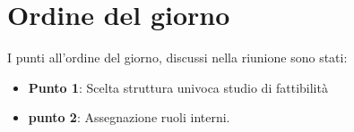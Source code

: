 \section{Ordine del giorno}
I punti all'ordine del giorno, discussi nella riunione sono stati:
\begin{itemize}

	\item \textbf{Punto 1}: Scelta struttura univoca studio di fattibilità
	\item \textbf{punto 2}: Assegnazione ruoli interni. 

\end{itemize}
